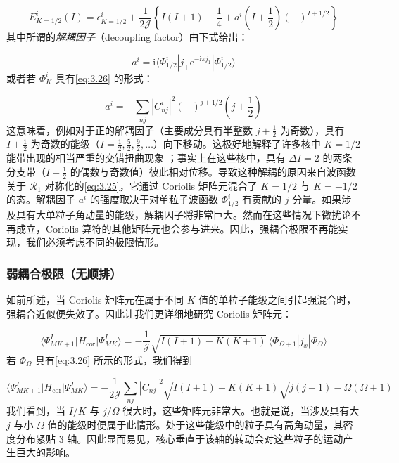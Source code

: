 \begin{equation}
E^{i}_{K=1/2}(I)=\epsilon^{i}_{K=1/2}+\frac{1}{2\mathcal{J}}\left\{ I(I+1)-\frac{1}{4}+a^{i}\left(I+\frac{1}{2}\right)(-)^{I+1/2}\right\} \label{eq:3.29}
\end{equation}
其中所谓的\emph{解耦因子}（decoupling factor）由下式给出：

\begin{equation}
a^{i}=\mathrm{i}\langle\Phi^{i}_{1/2}|j_{+}\mathrm{e}^{-\mathrm{i}\pi j_{1}}|\Phi^{i}_{1/2}\rangle\label{eq:3.30}
\end{equation}
或者若 $\Phi^{i}_{K}$ 具有\ref{eq:3.26} 的形式：

\begin{equation}
a^{i}=-\sum_{nj}|C^{i}_{nj}|^{2}(-)^{j+1/2}\left(j+\frac{1}{2}\right)\label{eq:3.31}
\end{equation}
这意味着，例如对于正的解耦因子（主要成分具有半整数 $j+\frac{1}{2}$ 为奇数），具有 $I+\frac{1}{2}$
为奇数的能级（$I=\frac{1}{2},\frac{5}{2},\frac{9}{2},\dots$）向下移动。这极好地解释了许多核中
$K=1/2$ 能带出现的相当严重的交错扭曲现象 \cite{ABH56}；事实上在这些核中，具有 $\Delta I=2$
的两条分支带（$I+\frac{1}{2}$ 的偶数与奇数值）彼此相对位移。导致这种解耦的原因来自波函数关于 $\mathcal{R}_{1}$
对称化的\ref{eq:3.25}，它通过 Coriolis 矩阵元混合了 $K=1/2$ 与 $K=-1/2$ 的态。解耦因子
$a^{i}$ 的强度取决于对单粒子波函数 $\Phi^{i}_{1/2}$ 有贡献的 $j$ 分量。如果涉及具有大单粒子角动量的能级，解耦因子将非常巨大。然而在这些情况下微扰论不再成立，Coriolis
算符的其他矩阵元也会参与进来。因此，强耦合极限不再能实现，我们必须考虑不同的极限情形。

\subsubsection{弱耦合极限（无顺排）}

如前所述，当 Coriolis 矩阵元在属于不同 $K$ 值的单粒子能级之间引起强混合时，强耦合近似便失效了。因此让我们更详细地研究
Coriolis 矩阵元：

\begin{equation}
\langle\Psi^{I}_{MK+1}|H_{\text{cor}}|\Psi^{I}_{MK}\rangle=-\frac{1}{\mathcal{J}}\sqrt{I(I+1)-K(K+1)}\,\langle\Phi_{\Omega+1}|j_{x}|\Phi_{\Omega}\rangle\label{eq:3.32}
\end{equation}
若 $\Phi_{\Omega}$ 具有\ref{eq:3.26} 所示的形式，我们得到

\begin{equation}
\langle\Psi^{I}_{MK+1}|H_{\text{cor}}|\Psi^{I}_{MK}\rangle=-\frac{1}{2\mathcal{J}}\sum_{nj}|C_{nj}|^{2}\sqrt{I(I+1)-K(K+1)}\sqrt{j(j+1)-\Omega(\Omega+1)}\label{eq:3.33}
\end{equation}
我们看到，当 $I/K$ 与 $j/\Omega$ 很大时，这些矩阵元非常大。也就是说，当涉及具有大 $j$ 与小 $\Omega$
值的能级时便属于此情形。处于这些能级中的粒子具有高角动量，其密度分布紧贴 3 轴。因此显而易见，核心垂直于该轴的转动会对这些粒子的运动产生巨大的影响。

